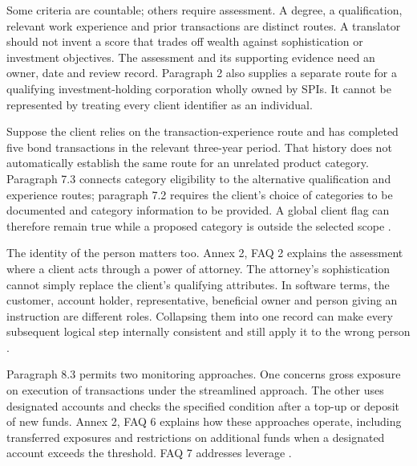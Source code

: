 
Some criteria are countable; others require assessment. A degree, a qualification,
relevant work experience and prior transactions are distinct routes. A translator
should not invent a score that trades off wealth against sophistication or
investment objectives. The assessment and its supporting evidence need an owner,
date and review record. Paragraph 2 also supplies a separate route for a qualifying
investment-holding corporation wholly owned by SPIs. It cannot be represented by
treating every client identifier as an individual.

Suppose the client relies on the transaction-experience route and has completed
five bond transactions in the relevant three-year period. That history does not
automatically establish the same route for an unrelated product category.
Paragraph 7.3 connects category eligibility to the alternative qualification and
experience routes; paragraph 7.2 requires the client's choice of categories to be
documented and category information to be provided. A global client flag can
therefore remain true while a proposed category is outside the selected scope
\citep[Annex 1, paras.~4.1, 7.1--7.3]{sfcspiannex1}.

The identity of the person matters too. Annex 2, FAQ 2 explains the assessment
where a client acts through a power of attorney. The attorney's sophistication
cannot simply replace the client's qualifying attributes. In software terms,
the customer, account holder, representative, beneficial owner and person giving
an instruction are different roles. Collapsing them into one record can make
every subsequent logical step internally consistent and still apply it to the
wrong person \citep[Annex 2, FAQ 2]{sfcspiannex2}.

Paragraph 8.3 permits two monitoring approaches. One concerns gross exposure on
execution of transactions under the streamlined approach. The other uses
designated accounts and checks the specified condition after a top-up or deposit
of new funds. Annex 2, FAQ 6 explains how these approaches operate, including
transferred exposures and restrictions on additional funds when a designated
account exceeds the threshold. FAQ 7 addresses leverage
\citep[Annex 1, para.~8.3; Annex 2, FAQs 6--7]{sfcspiannex1,sfcspiannex2}.

